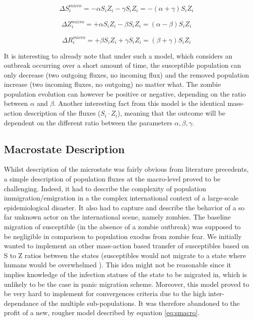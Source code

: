 \documentclass[11pt]{article} %
\begin{document}
\begin{equation}  \label{eq:smicro}
\Delta S_{i}^{micro} = -\alpha S_{i} Z_{i} -\gamma S_{i} Z_{i} = -(\alpha + \gamma) S_{i} Z_{i}
\end{equation}

\begin{equation} \label{eq:zmicro}
\Delta Z_{i}^{micro} = +\alpha S_{i} Z_{i} - \beta S_{i} Z_{i} = (\alpha - \beta) S_{i} Z_{i}
\end{equation}

\begin{equation} \label{eq:rmicro}
\Delta R_{i}^{micro} = +\beta S_{i} Z_{i} + \gamma S_{i} Z_{i} = (\beta + \gamma) S_{i} Z_{i}
\end{equation}
\bigskip

It is interesting to already note that under such a model, which considers an outbreak occurring over a short amount of time, the susceptible population can only decrease (two outgoing fluxes, no incoming flux) and the removed population increase (two incoming fluxes, no outgoing) no matter what. The zombie population evolution can however be positive or negative, depending on the ratio between $\alpha$ and $\beta$. Another interesting fact from this model is the identical mass-action description of the fluxes ($S_{i} \cdot Z_{i}$), meaning that the outcome will be dependent on the different ratio between the parameters $\alpha, \beta, \gamma$.

\subsection{Macrostate Description}\indent

Whilst description of the microstate was fairly obvious from literature precedents, a simple description of population fluxes at the macro-level proved to be challenging. Indeed, it had to describe the complexity of population immigration/emigration in a the complex international context of a large-scale epidemiological disaster. It also had to capture and describe the behavior of a so far unknown actor on the international scene, namely zombies. The baseline migration of susceptible (in the absence of a zombie outbreak) was supposed to be negligible in comparison to population exodus from zombie fear. We initially wanted to implement an other mass-action based transfer of susceptibles based on S to Z ratios between the states (susceptibles would not migrate to a state where humans would be overwhelmed ). This idea might not be reasonable since it implies knowledge of the infection statues of the state to be migrated in, which is unlikely to be the case in panic migration scheme. Moreover, this model proved to be very hard to implement for convergences criteria due to the high inter-dependance of the multiple sub-populations. It was therefore abandoned to the profit of a new, rougher model described by equation \eqref{eq:smacro}. 
\end{document}
